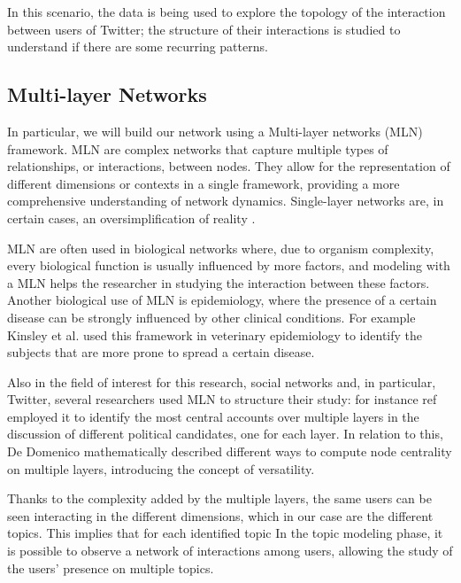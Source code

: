 In this scenario, the data is being used to explore the topology of the interaction between users of Twitter; the structure of their interactions is studied to understand if there are some recurring patterns.

\subsection{Multi-layer Networks}
In particular, we will build our network using a Multi-layer networks (MLN) framework\cite{kivela_multilayer_2014}. MLN are complex networks that capture multiple types of relationships, or interactions, between nodes. They allow for the representation of different dimensions or contexts in a single framework, providing a more comprehensive understanding of network dynamics. Single-layer networks are, in certain cases, an oversimplification of reality\cite{trax_multilayer_16} \cite{hammoud_multilayer_2020}.

MLN are often used in biological networks where, due to organism complexity, every biological function is usually influenced by more factors, and modeling with a MLN helps the researcher in studying the interaction between these factors. Another biological use of MLN is epidemiology, where the presence of a certain disease can be strongly influenced by other clinical conditions. For example Kinsley et al. \cite{kinsley_multilayer_2020} used this framework in veterinary epidemiology to identify the subjects that are more prone to spread a certain disease.

Also in the field of interest for this research, social networks and, in particular, Twitter, several researchers used MLN to structure their study: for instance ref \cite{nguyen_twitter_21} employed it to identify the most central accounts over multiple layers in the discussion of different political candidates, one for each layer. In relation to this, De Domenico \cite{de_domenico_ranking_2015} mathematically described different ways to compute node centrality on multiple layers, introducing the concept of versatility.

Thanks to the complexity added by the multiple layers, the same users can be seen interacting in the different dimensions, which in our case are the different topics. This implies that for each identified topic In the topic modeling phase, it is possible to observe a network of interactions among users, allowing the study of the users’ presence on multiple topics.




